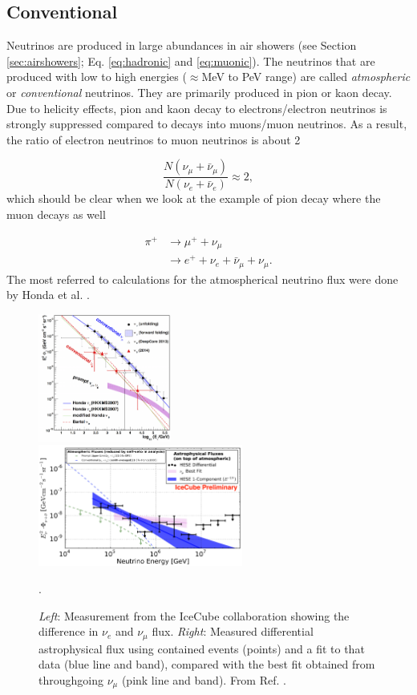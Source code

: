\subsection{Conventional}
Neutrinos are produced in large abundances in air showers (see Section \ref{sec:airshowers}; Eq. \ref{eq:hadronic} and \ref{eq:muonic}). The neutrinos that are produced with low to high energies ($\approx$MeV to PeV range) are called \textit{atmospheric} or \textit{conventional} neutrinos. They are primarily produced in pion or kaon decay. Due to helicity effects, pion and kaon decay to electrons/electron neutrinos is strongly suppressed compared to decays into muons/muon neutrinos. As a result, the ratio of electron neutrinos to muon neutrinos is about 2

\begin{equation}
\frac{N\left( \nu_\mu + \bar{\nu}_\mu\right) }{N\left(\nu_e + \bar{\nu}_e\right)} \approx 2,
\end{equation}
which should be clear when we look at the example of pion decay where the muon decays as well

\begin{align}
\pi^+ &\rightarrow \mu^+ + \nu_\mu \nonumber \\
& \rightarrow e^+ + \nu_e + \bar{\nu}_\mu + \nu_\mu.
\end{align}
The most referred to calculations for the atmospherical neutrino flux were done by Honda et al. \cite{Honda:2006qj}.
\begin{figure}[t]
\centering
\includegraphics[width=0.39\textwidth]{chapter3/img/neutrinospectrum2.png}
\includegraphics[width=0.6\textwidth]{chapter3/img/astroflux.png}
\caption{\textit{Left}: Measurement from the IceCube collaboration showing the difference in $\nu_e$ and $\nu_\mu$ flux. \textit{Right}: Measured differential astrophysical flux using contained events (points) and a fit to that data (blue line and band), compared with the best fit obtained from throughgoing $\nu_\mu$ (pink line and band). From Ref. \cite{Aartsen:2017mau}.}.
\label{fig:neutrinospectrum2}
\end{figure}

